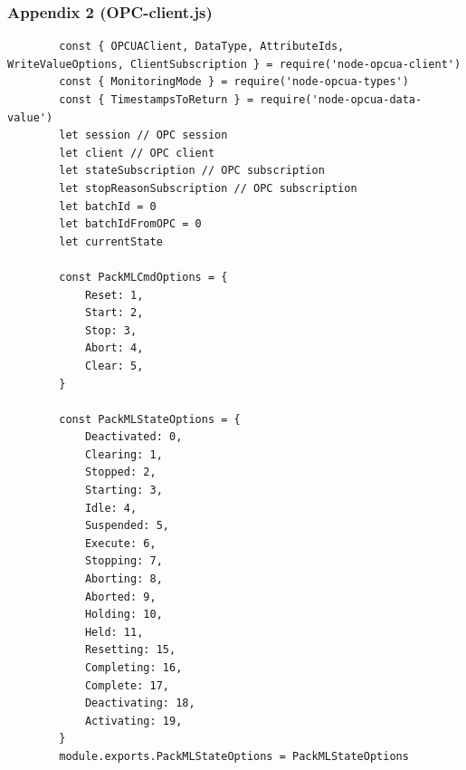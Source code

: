 \subsubsection{Appendix 2 (OPC-client.js)}
\begin{center}
    \begin{verbatim}
        const { OPCUAClient, DataType, AttributeIds, WriteValueOptions, ClientSubscription } = require('node-opcua-client')
        const { MonitoringMode } = require('node-opcua-types')
        const { TimestampsToReturn } = require('node-opcua-data-value')
        let session // OPC session
        let client // OPC client
        let stateSubscription // OPC subscription
        let stopReasonSubscription // OPC subscription
        let batchId = 0
        let batchIdFromOPC = 0
        let currentState

        const PackMLCmdOptions = {
            Reset: 1,
            Start: 2,
            Stop: 3,
            Abort: 4,
            Clear: 5,
        }

        const PackMLStateOptions = {
            Deactivated: 0,
            Clearing: 1,
            Stopped: 2,
            Starting: 3,
            Idle: 4,
            Suspended: 5,
            Execute: 6,
            Stopping: 7,
            Aborting: 8,
            Aborted: 9,
            Holding: 10,
            Held: 11,
            Resetting: 15,
            Completing: 16,
            Complete: 17,
            Deactivating: 18,
            Activating: 19,
        }
        module.exports.PackMLStateOptions = PackMLStateOptions


\end{verbatim}
\end{center}
